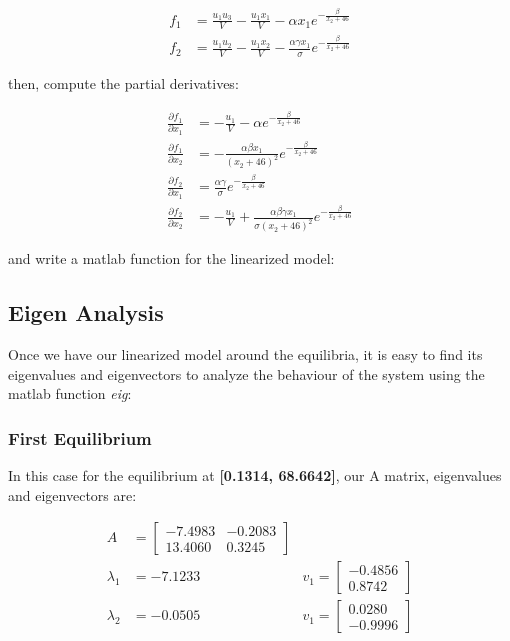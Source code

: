 \documentclass[12pt,letterpaper]{article}
\begin{document}
\begin{align}
    f_1 &= \frac{u_1 u_3}{V} - \frac{u_1 x_1}{V} - \alpha x_1 e^{-\frac{\beta}{x_2 + 46}} \\
    f_2 &= \frac{u_1 u_2}{V} - \frac{u_1 x_2}{V} - \frac{\alpha \gamma x_1}{\sigma} e^{-\frac{\beta}{x_2 + 46}}
\end{align}

then, compute the partial derivatives:

\begin{align}
    \frac{\partial f_1}{\partial x_1} &= -\frac{u_1}{V} - \alpha e^{-\frac{\beta}{x_2 + 46}} \\
    \frac{\partial f_1}{\partial x_2} &= -\frac{\alpha \beta x_1}{(x_2 + 46)^2} e^{-\frac{\beta}{x_2 + 46}} \\
    \frac{\partial f_2}{\partial x_1} &= \frac{\alpha \gamma}{\sigma} e^{-\frac{\beta}{x_2 + 46}} \\
    \frac{\partial f_2}{\partial x_2} &= -\frac{u_1}{V} + \frac{\alpha \beta \gamma x_1}{\sigma(x_2 + 46)^2} e^{-\frac{\beta}{x_2 + 46}}
\end{align}

and write a matlab function for the linearized model:


\subsection{Eigen Analysis}

Once we have our linearized model around the equilibria, it is easy to find its eigenvalues and eigenvectors
to analyze the behaviour of the system using the matlab function \textit{eig}:



\subsubsection{First Equilibrium}
In this case for the equilibrium at \textbf{[0.1314, 68.6642]}, our A matrix, eigenvalues and eigenvectors are:

\begin{align}
    A &= \begin{bmatrix}
        -7.4983 & -0.2083 \\
        13.4060 & 0.3245
    \end{bmatrix} & \\
    \lambda_1 &= -7.1233 &v_1 = \begin{bmatrix}
        -0.4856 \\0.8742
    \end{bmatrix} \\ 
    \lambda_2 &= -0.0505 &v_1 = \begin{bmatrix}
        0.0280 \\-0.9996
    \end{bmatrix}
\end{align}
\end{document}
